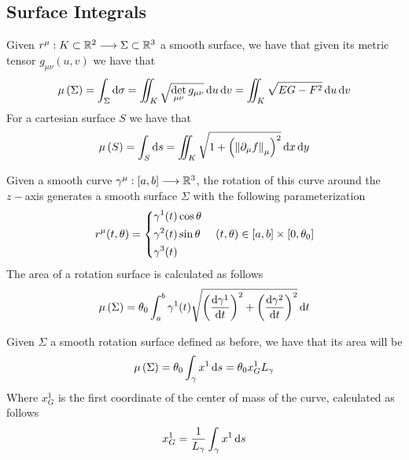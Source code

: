 \documentclass[../complete.tex]{subfiles}
\begin{document}
\subsection{Surface Integrals}
\begin{dfn}
	Given $r^\mu:K\subset\mathbb{R}^2\overset{}{\longrightarrow}\Sigma\subset\mathbb{R}^3$ a smooth surface, we have that given its metric tensor $g_{\mu\nu}(u,v)$ we have that
	\begin{equation}
		\mu\left( \Sigma \right)=\int_{\Sigma}^{}\operatorname{d\!}\sigma=\iint_K\sqrt{\det_{\mu\nu}g_{\mu\nu}}\operatorname{d\!} u\operatorname{d\!} v=\iint_K\sqrt{EG-F^2}\operatorname{d\!} u\operatorname{d\!} v
		\label{eq:measuresurface}
	\end{equation}
	For a cartesian surface $S$ we have that
	\begin{equation}
		\mu\left( S \right)=\int_{S}^{}\operatorname{d\!} s=\iint_K\sqrt{1+\left(\norm{\partial_\mu f}_\mu\right)^2}\operatorname{d\!} x\operatorname{d\!} y
		\label{eq:cartesiansurf}
	\end{equation}
\end{dfn}
\begin{dfn}
	Given a smooth curve $\gamma^\mu:[a,b]\overset{}{\longrightarrow}\mathbb{R}^3$, the rotation of this curve around the $z-$axis generates a smooth surface $\Sigma$ with the following parameterization
	\begin{equation}
		r^\mu(t,\theta)=\begin{dcases}\gamma^1(t)\cos\theta\\\gamma^2(t)\sin\theta\\\gamma^3(t)\end{dcases}\quad(t,\theta)\in[a,b]\times[0,\theta_0]
		\label{eq:rotationsurf}
	\end{equation}
	The area of a rotation surface is calculated as follows
	\begin{equation}
		\mu\left( \Sigma \right)=\theta_0\int_a^b\gamma^1(t)\sqrt{\left( \derivative{\gamma^1}{t} \right)^2+\left( \derivative{\gamma^2}{t} \right)^2}\diff t
		\label{eq:rotationsurfarea}
	\end{equation}
\end{dfn}
\begin{thm}[Guldino II]
	Given $\Sigma$ a smooth rotation surface defined as before, we have that its area will be
	\begin{equation}
		\mu\left( \Sigma \right)=\theta_0\int_\gamma x^1\operatorname{d\!} s=\theta_0 x_G^1L_\gamma
		\label{eq:rotationsurfguldino}
	\end{equation}
	Where $x_G^1$ is the first coordinate of the center of mass of the curve, calculated as follows
	\begin{equation*}
		x_G^1=\frac{1}{L_\gamma}\int_\gamma x^1\operatorname{d\!} s
	\end{equation*}
\end{thm}
\end{document}
